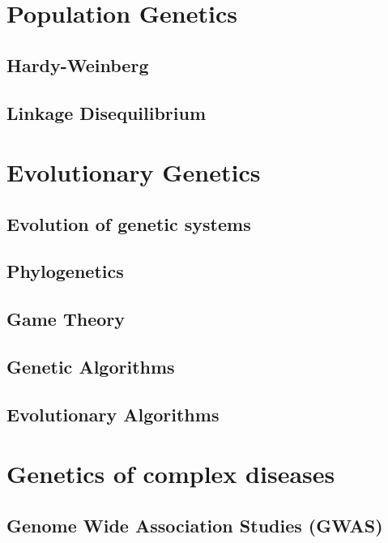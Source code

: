 \documentclass[12pt,]{book}
\theoremstyle{definition}
\theoremstyle{definition}
\theoremstyle{remark}
\begin{document}
\chapter{Population Genetics}\label{population-genetics}

\section{Hardy-Weinberg}\label{hardy-weinberg}

\section{Linkage Disequilibrium}\label{linkage-disequilibrium}

\chapter{Evolutionary Genetics}\label{evolutionary-genetics}

\section{Evolution of genetic systems}\label{evolution-of-genetic-systems}

\section{Phylogenetics}\label{phylogenetics}

\section{Game Theory}\label{game-theory}

\section{Genetic Algorithms}\label{genetic-algorithms}

\section{Evolutionary Algorithms}\label{evolutionary-algorithms}

\chapter{Genetics of complex diseases}\label{genetics-of-complex-diseases}

\section{Genome Wide Association Studies
	(GWAS)}\label{genome-wide-association-studies-gwas}
\end{document}
